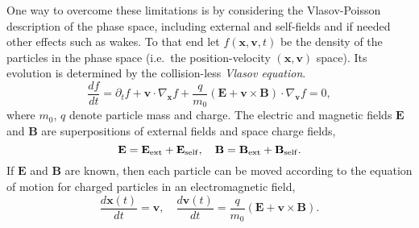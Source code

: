 One way to overcome these limitations is by considering the
Vlasov-Poisson description of the phase space, including external and
self-fields and if needed other effects such as wakes.  To that end let
$f(\mathbf{x},\mathbf{v},t)$ be the density of the particles in the
phase space (i.e.\ the position-velocity $(\mathbf{x}, \mathbf{v})$
space).  Its evolution is determined by the collision-less \emph{Vlasov
  equation}.
\begin{equation}\label{eq:Vlasov}
  \frac{df}{dt}=\partial_t f + \mathbf{v} \cdot \nabla_{\mathbf{x}} f
  +\frac{q}{m_0}(\mathbf{E}+ \mathbf{v}\times\mathbf{B})\cdot
  \nabla_{\mathbf{v}} f  =  0,
\end{equation}
where $m_0$, $q$ denote particle mass and charge.  The electric and
magnetic fields $\mathbf{E}$ and $\mathbf{B}$ are superpositions of
external fields and space charge fields,
\begin{equation}\label{eq:allfield}
    \mathbf{E} =
    \mathbf{E_{\RM{ext}}} + \mathbf{E_{\RM{self}}}, \quad
    \mathbf{B} =
    \mathbf{B_{\RM{ext}}} + \mathbf{B_{\RM{self}}}.
\end{equation}
If $\mathbf{E}$ and $\mathbf{B}$ are known, then each particle can be
moved according to the equation of motion for charged particles in an
electromagnetic field,
\begin{equation*}\label{eq:motion}
  \frac{d\mathbf{x}(t)}{dt}  = \mathbf{v},
  \quad
  \frac{d\mathbf{v}(t)}{dt}  = \frac{q}{m_0}\left(\mathbf{E} +
    \mathbf{v}\times \mathbf{B}\right).
\end{equation*}


